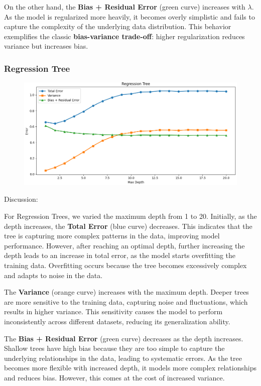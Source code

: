 \documentclass[a4paper,10pt]{article}
\begin{document}
On the other hand, the \textbf{Bias + Residual Error} (green curve) increases with \(\lambda\). As the model is regularized more heavily, it becomes overly simplistic and fails to capture the complexity of the underlying data distribution. This behavior exemplifies the classic \textbf{bias-variance trade-off}: higher regularization reduces variance but increases bias.

\subsubsection{Regression Tree}

\begin{figure}[H]
    \centering
    \includegraphics[width=0.8\linewidth]{2.3_rt.png}
\end{figure}

Discussion:

For Regression Trees, we varied the maximum depth from 1 to 20. Initially, as the depth increases, the \textbf{Total Error} (blue curve) decreases. This indicates that the tree is capturing more complex patterns in the data, improving model performance. However, after reaching an optimal depth, further increasing the depth leads to an increase in total error, as the model starts overfitting the training data. Overfitting occurs because the tree becomes excessively complex and adapts to noise in the data.

The \textbf{Variance} (orange curve) increases with the maximum depth. Deeper trees are more sensitive to the training data, capturing noise and fluctuations, which results in higher variance. This sensitivity causes the model to perform inconsistently across different datasets, reducing its generalization ability.

The \textbf{Bias + Residual Error} (green curve) decreases as the depth increases. Shallow trees have high bias because they are too simple to capture the underlying relationships in the data, leading to systematic errors. As the tree becomes more flexible with increased depth, it models more complex relationships and reduces bias. However, this comes at the cost of increased variance.
\end{document}
